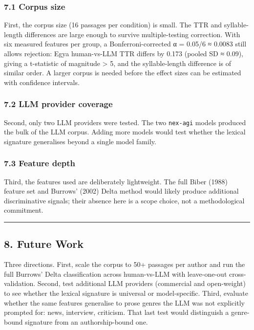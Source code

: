 \subsubsection{7.1 Corpus size}\label{corpus-size}

First, the corpus size (16 passages per condition) is small. The TTR and
syllable-length differences are large enough to survive multiple-testing
correction. With six measured features per group, a Bonferroni-corrected
α = 0.05/6 ≈ 0.0083 still allows rejection: Egya human-vs-LLM TTR
differs by 0.173 (pooled SD ≈ 0.09), giving a t-statistic of magnitude
\textgreater{} 5, and the syllable-length difference is of similar
order. A larger corpus is needed before the effect sizes can be
estimated with confidence intervals.

\subsubsection{7.2 LLM provider coverage}\label{llm-provider-coverage}

Second, only two LLM providers were tested. The two \texttt{nex-agi}
models produced the bulk of the LLM corpus. Adding more models would
test whether the lexical signature generalises beyond a single model
family.

\subsubsection{7.3 Feature depth}\label{feature-depth}

Third, the features used are deliberately lightweight. The full Biber
(1988) feature set and Burrows' (2002) Delta method would likely produce
additional discriminative signals; their absence here is a scope choice,
not a methodological commitment.

\begin{center}\rule{0.5\linewidth}{0.5pt}\end{center}

\subsection{8. Future Work}\label{future-work}

Three directions. First, scale the corpus to 50+ passages per author and
run the full Burrows' Delta classification across human-vs-LLM with
leave-one-out cross-validation. Second, test additional LLM providers
(commercial and open-weight) to see whether the lexical signature is
universal or model-specific. Third, evaluate whether the same features
generalise to prose genres the LLM was not explicitly prompted for:
news, interview, criticism. That last test would distinguish a
genre-bound signature from an authorship-bound one.

